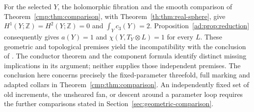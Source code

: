 \documentclass[11pt]{article}
\numberwithin{equation}{section}
\begin{document}
For the selected $Y$, the holomorphic fibration and the smooth
comparison of Theorem~\ref{cmp:thm:comparison}, with
Theorem~\ref{th:thm:real-sphere}, give
$H^1(Y;\mathbb Z)=H^2(Y;\mathbb Z)=0$ and
$\int_Yc_3(Y)=2$.
Proposition~\ref{ad:prop:reduction} consequently gives $a(Y)=1$
and $\chi(Y,T_Y\otimes L)=1$ for every $L$.
These geometric and topological premises yield the incompatibility
with the conclusion of \cite[Theorem~2.2]{CDP2020}.
The conductor theorem and the component formula identify distinct
missing implications in its argument; neither supplies those
independent premises. The conclusion here concerns precisely the
fixed-parameter threefold, full marking and adapted collars in
Theorem~\ref{cmp:thm:comparison}. An independently fixed set of old
increments, the unsheared fan, or descent around a parameter loop
requires the further comparisons stated in Section~\ref{sec:geometric-comparison}.








\end{document}

